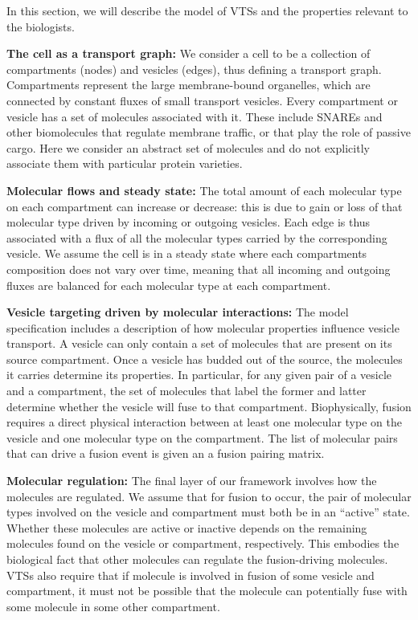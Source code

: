 %
In this section, we will describe the model of VTSs and the properties
relevant to the biologists.

\textbf{The cell as a transport graph:} We consider a cell to be a
collection of compartments (nodes) and vesicles (edges), thus defining
a transport graph.
%
Compartments represent the large membrane-bound organelles, which are
connected by constant fluxes of small transport vesicles.
%
Every compartment or vesicle has a set of molecules associated with
it.
%
These include SNAREs and other biomolecules that regulate membrane
traffic, or that play the role of passive cargo.
%
Here we consider an abstract set of molecules and do
not explicitly associate them with particular protein varieties.

\textbf{Molecular flows and steady state:} The total amount of each
molecular type on each compartment can increase or decrease: this is
due to gain or loss of that molecular type driven by incoming or
outgoing vesicles.
%
Each edge is thus associated with a flux of all the molecular types
carried by the corresponding vesicle.
%
We assume the cell is in a steady state where each compartments
composition does not vary over time, meaning that all incoming and
outgoing fluxes are balanced for each molecular type at each
compartment.

\textbf{Vesicle targeting driven by molecular interactions:} The model
specification includes a description of how molecular properties
influence vesicle transport.
%
A vesicle can only contain a set of molecules that are present
on its source compartment.
%
Once a vesicle has budded out of the source, the molecules it carries
determine its properties.
%
In particular, for any given pair of a vesicle and a compartment, the
set of molecules that label the former and latter determine whether
the vesicle will fuse to that compartment.
%
Biophysically, fusion requires a direct physical interaction between
at least one molecular type on the vesicle and one molecular type on
the compartment.
%
The list of molecular pairs that can drive a fusion event is given an
a fusion pairing matrix.

\textbf{Molecular regulation:} The final layer of our framework
involves how the molecules are regulated.
%
We assume that for fusion to occur, the pair of molecular types
involved on the vesicle and compartment must both be in an
“active” state.
%
Whether these molecules are active or inactive depends on the
remaining molecules found on the vesicle or compartment, respectively.
%
This embodies the biological fact that other molecules can regulate the
fusion-driving molecules.
%
VTSs also require that if molecule is involved in fusion of some
vesicle and compartment, it must not be possible that the molecule 
can potentially fuse with some molecule in some other compartment.
%

